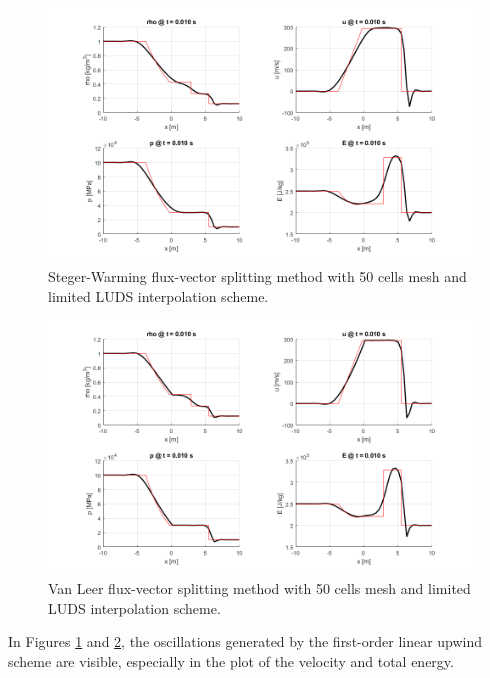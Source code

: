 \begin{figure}[H]
    \centering
    \includegraphics[width=\textwidth]{img/SW50_LUDS.png}
    \caption{Steger-Warming flux-vector splitting method with 50 cells mesh and limited LUDS interpolation scheme.}
    \label{fig:SW50_LUDS}
\end{figure}

\begin{figure}[H]
    \centering
    \includegraphics[width=\textwidth]{img/VL50_LUDS.png}
    \caption{Van Leer flux-vector splitting method with 50 cells mesh and limited LUDS interpolation scheme.}
    \label{fig:VL50_LUDS}
\end{figure}

In Figures \ref{fig:SW50_LUDS} and \ref{fig:VL50_LUDS}, the oscillations generated by the first-order linear upwind scheme are visible, especially in the plot of the velocity and total energy.